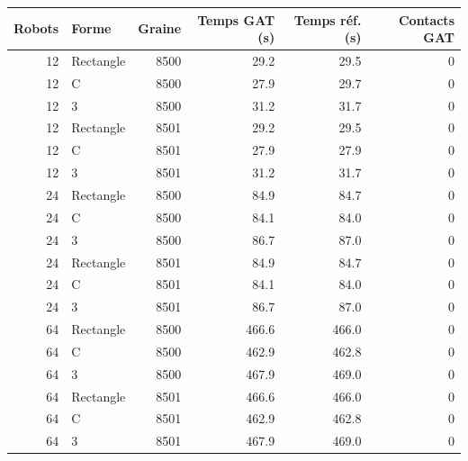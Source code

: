 \begin{tabular}{rlrrrr}
\toprule
Robots & Forme & Graine & Temps GAT (s) & Temps réf. (s) & Contacts GAT\\\midrule
12 & Rectangle & 8500 & 29.2 & 29.5 & 0 \\
12 & C & 8500 & 27.9 & 29.7 & 0 \\
12 & 3 & 8500 & 31.2 & 31.7 & 0 \\
12 & Rectangle & 8501 & 29.2 & 29.5 & 0 \\
12 & C & 8501 & 27.9 & 27.9 & 0 \\
12 & 3 & 8501 & 31.2 & 31.7 & 0 \\
24 & Rectangle & 8500 & 84.9 & 84.7 & 0 \\
24 & C & 8500 & 84.1 & 84.0 & 0 \\
24 & 3 & 8500 & 86.7 & 87.0 & 0 \\
24 & Rectangle & 8501 & 84.9 & 84.7 & 0 \\
24 & C & 8501 & 84.1 & 84.0 & 0 \\
24 & 3 & 8501 & 86.7 & 87.0 & 0 \\
64 & Rectangle & 8500 & 466.6 & 466.0 & 0 \\
64 & C & 8500 & 462.9 & 462.8 & 0 \\
64 & 3 & 8500 & 467.9 & 469.0 & 0 \\
64 & Rectangle & 8501 & 466.6 & 466.0 & 0 \\
64 & C & 8501 & 462.9 & 462.8 & 0 \\
64 & 3 & 8501 & 467.9 & 469.0 & 0 \\
\bottomrule\end{tabular}
